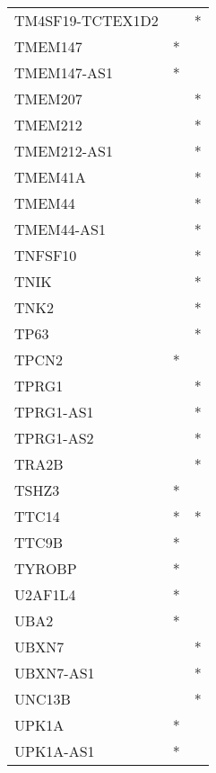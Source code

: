 \begin{longtable}{lcc}
TM4SF19-TCTEX1D2 &                &          * \\
TMEM147          &              * &            \\
TMEM147-AS1      &              * &            \\
TMEM207          &                &          * \\
TMEM212          &                &          * \\
TMEM212-AS1      &                &          * \\
TMEM41A          &                &          * \\
TMEM44           &                &          * \\
TMEM44-AS1       &                &          * \\
TNFSF10          &                &          * \\
TNIK             &                &          * \\
TNK2             &                &          * \\
TP63             &                &          * \\
TPCN2            &              * &            \\
TPRG1            &                &          * \\
TPRG1-AS1        &                &          * \\
TPRG1-AS2        &                &          * \\
TRA2B            &                &          * \\
TSHZ3            &              * &            \\
TTC14            &              * &          * \\
TTC9B            &              * &            \\
TYROBP           &              * &            \\
U2AF1L4          &              * &            \\
UBA2             &              * &            \\
UBXN7            &                &          * \\
UBXN7-AS1        &                &          * \\
UNC13B           &                &          * \\
UPK1A            &              * &            \\
UPK1A-AS1        &              * &            \\

\end{longtable}

